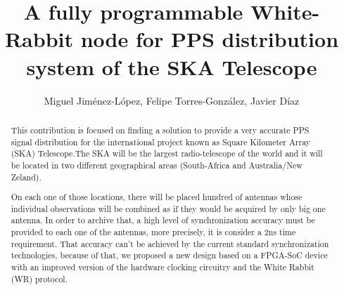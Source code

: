 \documentclass[review]{elsarticle}
\begin{document}
\begin{frontmatter}

\title{A fully programmable White-Rabbit node for PPS distribution system of the SKA Telescope}


\author{Miguel Jiménez-López, Felipe Torres-González, Javier Díaz}
\address{CITIC, ETSIIT, University of Granada, Spain}





\begin{abstract} 
	This contribution is focused on finding a solution to provide a very 
	accurate PPS signal distribution for the international project known as 
	Square Kilometer Array (SKA) Telescope.The SKA will be the largest 
	radio-telescope of the world and it will be located in two different 
	geographical areas (South-Africa and Australia/New Zeland). 
    
    On each one of those locations, there will be placed hundred of antennas 
    whose individual observations will be combined as if they would be acquired 
    by only big one antenna. In order to archive that, a high level of 
    synchronization accuracy must be provided to each one of the antennas, more 
    precisely, it is consider a 2ns time requirement. That accuracy can't be 
    achieved by the current standard synchronization technologies, because of 
    that, we proposed a new design based on a FPGA-SoC device with an improved 
    version of the hardware clocking circuitry and the White 
    Rabbit (WR) protocol.
    

\end{abstract}
\end{frontmatter}
\end{document}
